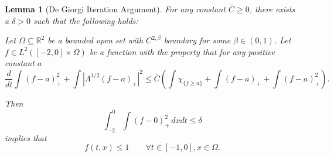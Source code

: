 \documentclass[11pt]{amsart}
\newtheorem{lemma}[theorem]{Lemma}
\theoremstyle{remark}
\theoremstyle{definition}
\newcommand{\R}{\mathbb{R}}
\newcommand{\paren}[1]{\left( #1 \right)}
\newcommand{\abs}[1]{\left\lvert #1 \right\rvert}
\newcommand{\ddt}{\frac{d}{dt}}
\newcommand{\indic}[1]{\chi_{\{#1\}}}
\begin{document}
\begin{lemma}[De Giorgi Iteration Argument] \label{thm:DG1 skeleton}
For any constant $\bar{C} \geq 0$, there exists a $\delta>0$ such that the following holds:

Let $\Omega \subseteq \R^2$ be a bounded open set with $C^{2,\beta}$ boundary for some $\beta \in (0,1)$.  
Let $f \in L^2([-2,0]\times\Omega)$ be a function with the property that for any positive constant $a$
\begin{equation} \label{DG energy ddt} \ddt \int (f-a)_+^2 + \int \abs{\Lambda^{1/2} (f-a)_+}^2 \leq \bar{C} \paren{ \int \indic{f \geq a} + \int (f-a)_+ + \int (f-a)_+^2 }. \end{equation}

Then
\[ \int_{-2}^0 \int (f-0)_+^2 \,dxdt \leq \delta \]
implies that
\[ f(t,x) \leq 1 \qquad \forall t\in[-1,0], x \in \Omega. \]
\end{lemma}
\end{document}

